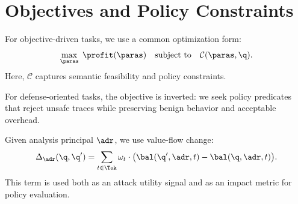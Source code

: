 \section{Objectives and Policy Constraints}

For objective-driven tasks, we use a common optimization form:
\[
\max_{\paras} \; \profit(\paras) \quad \text{subject to} \quad \mathcal{C}(\paras,\q).
\]
Here, $\mathcal{C}$ captures semantic feasibility and policy constraints.

For defense-oriented tasks, the objective is inverted:
we seek policy predicates that reject unsafe traces while preserving benign behavior and acceptable overhead.

Given analysis principal $\adr$, we use value-flow change:
\[
\Delta_{\adr}(\q,\q') = \sum_{t\in\Tok} \omega_t\cdot\big(\bal(\q',\adr,t)-\bal(\q,\adr,t)\big).
\]
This term is used both as an attack utility signal and as an impact metric for policy evaluation.
